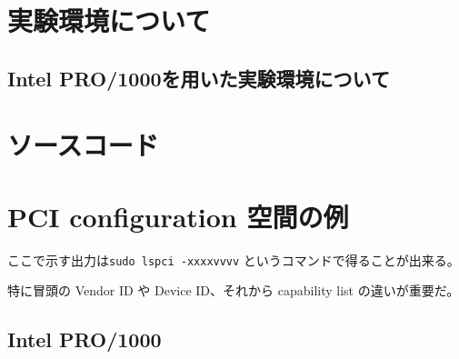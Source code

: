 \documentclass[a4paper,11pt,report]{ltjsbook}
\begin{document}
\appendix
\chapter{実験環境について}
\section{Intel PRO/1000を用いた実験環境について}
\label{letsnote}

\chapter{ソースコード}

\chapter{PCI configuration 空間の例}

ここで示す出力は\texttt{sudo lspci -xxxxvvvv} というコマンドで得ることが出来る。

特に冒頭の Vendor ID や Device ID、それから capability list の違いが重要だ。

\section{Intel PRO/1000}
\end{document}
